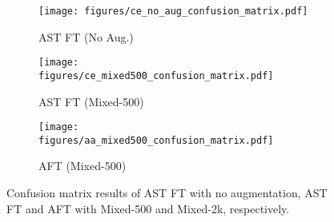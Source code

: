 \documentclass{article}
\begin{document}
\begin{figure}[!h]
    \centering
    \begin{subfigure}{.5\linewidth}
      \centering
      \texttt{[image: figures/ce\_no\_aug\_confusion\_matrix.pdf]}
      \caption{AST FT (No Aug.)}
      \label{fig:sfig1}
    \end{subfigure}\begin{subfigure}{.5\linewidth}
      \centering
      \texttt{[image: figures/ce\_mixed500\_confusion\_matrix.pdf]}
      \caption{AST FT (Mixed-500)}
      \label{fig:sfig2}
    \end{subfigure}
    \begin{subfigure}{.5\linewidth}
      \centering
      \texttt{[image: figures/aa\_mixed500\_confusion\_matrix.pdf]}
      \caption{AFT (Mixed-500)}
      \label{fig:sfig3}
    \end{subfigure}
    \caption{Confusion matrix results of AST FT with no augmentation, AST FT and AFT with Mixed-500 and Mixed-2k, respectively.}
    \label{fig:confusion_matrices}
    
    \end{figure}
    
\vfill\pagebreak
\end{document}

